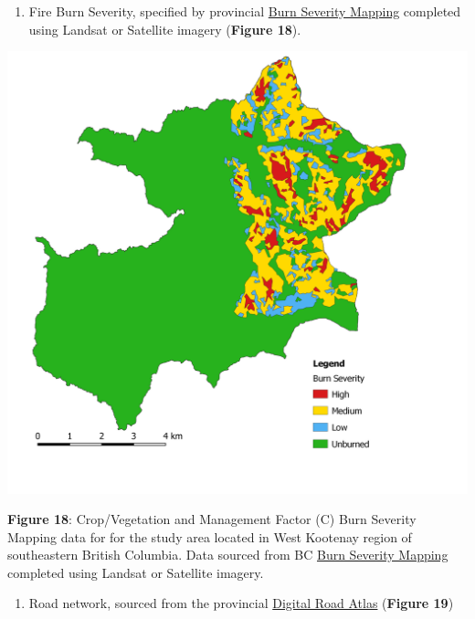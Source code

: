 \documentclass[
]{article}
\providecommand{\tightlist}{%
  \setlength{\itemsep}{0pt}\setlength{\parskip}{0pt}}
\begin{document}
\begin{enumerate}
\def\labelenumi{\arabic{enumi}.}
\setcounter{enumi}{1}
\tightlist
\item
  Fire Burn Severity, specified by provincial \href{https://catalogue.data.gov.bc.ca/dataset/fire-burn-severity-historical}{Burn Severity Mapping} completed using Landsat or Satellite imagery (\textbf{Figure 18}).
\end{enumerate}

\includegraphics{img/c_factor_input_bs.png}

\textbf{Figure 18}: Crop/Vegetation and Management Factor (C) Burn Severity Mapping data for for the study area located in West Kootenay region of southeastern British Columbia. Data sourced from BC \href{https://catalogue.data.gov.bc.ca/dataset/fire-burn-severity-historical}{Burn Severity Mapping} completed using Landsat or Satellite imagery.

\begin{enumerate}
\def\labelenumi{\arabic{enumi}.}
\setcounter{enumi}{2}
\tightlist
\item
  Road network, sourced from the provincial \href{https://www2.gov.bc.ca/gov/content/data/geographic-data-services/topographic-data/roads}{Digital Road Atlas} (\textbf{Figure 19})
\end{enumerate}
\end{document}
